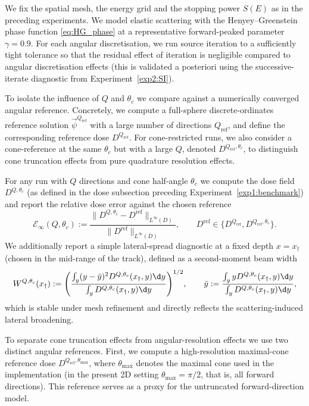 \documentclass[final]{amsart}
\begin{document}
We fix the spatial mesh, the energy grid and the stopping power $S(E)$
as in the preceding experiments. We model elastic scattering with the
Henyey--Greenstein phase function \eqref{eq:HG_phase} at a
representative forward-peaked parameter $\gamma=0.9$. For each angular
discretisation, we run source iteration to a sufficiently tight
tolerance so that the residual effect of iteration is negligible
compared to angular discretisation effects (this is validated a
posteriori using the successive-iterate diagnostic from
Experiment~\ref{exp2:SI}).

To isolate the influence of $Q$ and $\theta_c$ we compare against a
numerically converged angular reference. Concretely, we compute a
full-sphere discrete-ordinates reference solution
$\vec\psi^{ Q_{\mathrm{ref}}}$ with a large number of directions
$Q_{\mathrm{ref}}$, and define the corresponding reference dose
$D^{Q_{\mathrm{ref}}}$. For cone-restricted runs, we also consider a
cone-reference at the same $\theta_c$ but with a large $Q$, denoted
$D^{Q_{\mathrm{ref}},\theta_c}$, to distinguish cone truncation
effects from pure quadrature resolution effects.

For any run with $Q$ directions and cone half-angle $\theta_c$ we
compute the dose field $D^{Q,\theta_c}$ (as defined in the dose
subsection preceding Experiment~\ref{exp1:benchmark}) and report the
relative dose error against the chosen reference
\[
  \mathcal{E}_\infty(Q,\theta_c)
  :=
  \frac{\|D^{Q,\theta_c}-D^{\mathrm{ref}}\|_{L^\infty(D)}}{\|D^{\mathrm{ref}}\|_{L^\infty(D)}},
  \qquad
  D^{\mathrm{ref}}\in\{D^{Q_{\mathrm{ref}}}, D^{Q_{\mathrm{ref}},\theta_c}\}.
\]
We additionally report a simple lateral-spread diagnostic at a fixed
depth $x=x_\dagger$ (chosen in the mid-range of the track), defined as a
second-moment beam width
\[
  W^{Q,\theta_c}(x_\dagger)
  :=
  \Bigg(
  \frac{\int_{y} (y-\bar y)^2 D^{Q,\theta_c}(x_\dagger,y) \d y}
       {\int_{y} D^{Q,\theta_c}(x_\dagger,y) \d y}
  \Bigg)^{1/2},
  \qquad
  \bar y
  :=
  \frac{\int_y y D^{Q,\theta_c}(x_\dagger,y) \d y}{\int_y D^{Q,\theta_c}(x_\dagger,y) \d y},
\]
which is stable under mesh refinement and directly reflects the
scattering-induced lateral broadening.

To separate cone truncation effects from angular-resolution effects we
use two distinct angular references.  First, we compute a
high-resolution maximal-cone reference dose
$D^{Q_{\mathrm{ref}},\theta_{\max}}$, where $\theta_{\max}$ denotes
the maximal cone used in the implementation (in the present 2D setting
$\theta_{\max}=\pi/2$, that is, all forward directions). This
reference serves as a proxy for the untruncated forward-direction
model.
\end{document}
